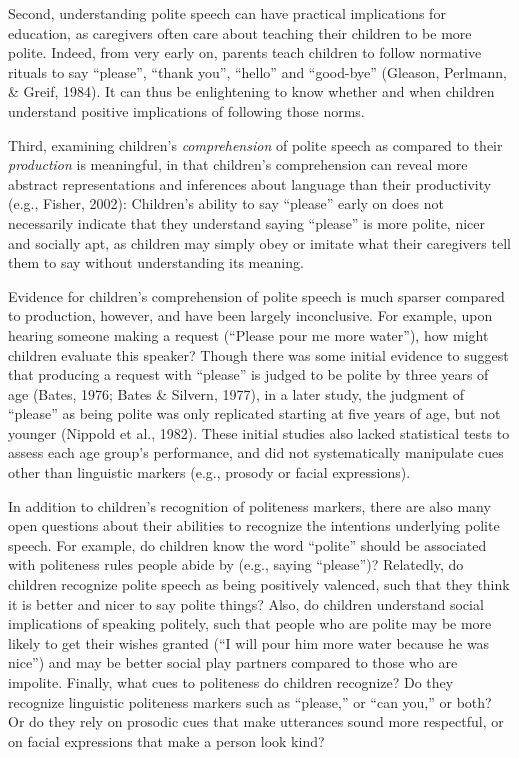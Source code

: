 \documentclass[10pt, letterpaper]{article}
\begin{document}
Second, understanding polite speech can have practical implications for
education, as caregivers often care about teaching their children to be
more polite. Indeed, from very early on, parents teach children to
follow normative rituals to say ``please'', ``thank you'', ``hello'' and
``good-bye'' (Gleason, Perlmann, \& Greif, 1984). It can thus be
enlightening to know whether and when children understand positive
implications of following those norms.

Third, examining children's \emph{comprehension} of polite speech as
compared to their \emph{production} is meaningful, in that children's
comprehension can reveal more abstract representations and inferences
about language than their productivity (e.g., Fisher, 2002): Children's
ability to say ``please'' early on does not necessarily indicate that
they understand saying ``please'' is more polite, nicer and socially
apt, as children may simply obey or imitate what their caregivers tell
them to say without understanding its meaning.

Evidence for children's comprehension of polite speech is much sparser
compared to production, however, and have been largely inconclusive. For
example, upon hearing someone making a request (``Please pour me more
water''), how might children evaluate this speaker? Though there was
some initial evidence to suggest that producing a request with
``please'' is judged to be polite by three years of age (Bates, 1976;
Bates \& Silvern, 1977), in a later study, the judgment of ``please'' as
being polite was only replicated starting at five years of age, but not
younger (Nippold et al., 1982). These initial studies also lacked
statistical tests to assess each age group's performance, and did not
systematically manipulate cues other than linguistic markers (e.g.,
prosody or facial expressions).

In addition to children's recognition of politeness markers, there are
also many open questions about their abilities to recognize the
intentions underlying polite speech. For example, do children know the
word ``polite'' should be associated with politeness rules people abide
by (e.g., saying ``please'')? Relatedly, do children recognize polite
speech as being positively valenced, such that they think it is better
and nicer to say polite things? Also, do children understand social
implications of speaking politely, such that people who are polite may
be more likely to get their wishes granted (``I will pour him more water
because he was nice'') and may be better social play partners compared
to those who are impolite. Finally, what cues to politeness do children
recognize? Do they recognize linguistic politeness markers such as
``please,'' or ``can you,'' or both? Or do they rely on prosodic cues
that make utterances sound more respectful, or on facial expressions
that make a person look kind?
\end{document}
